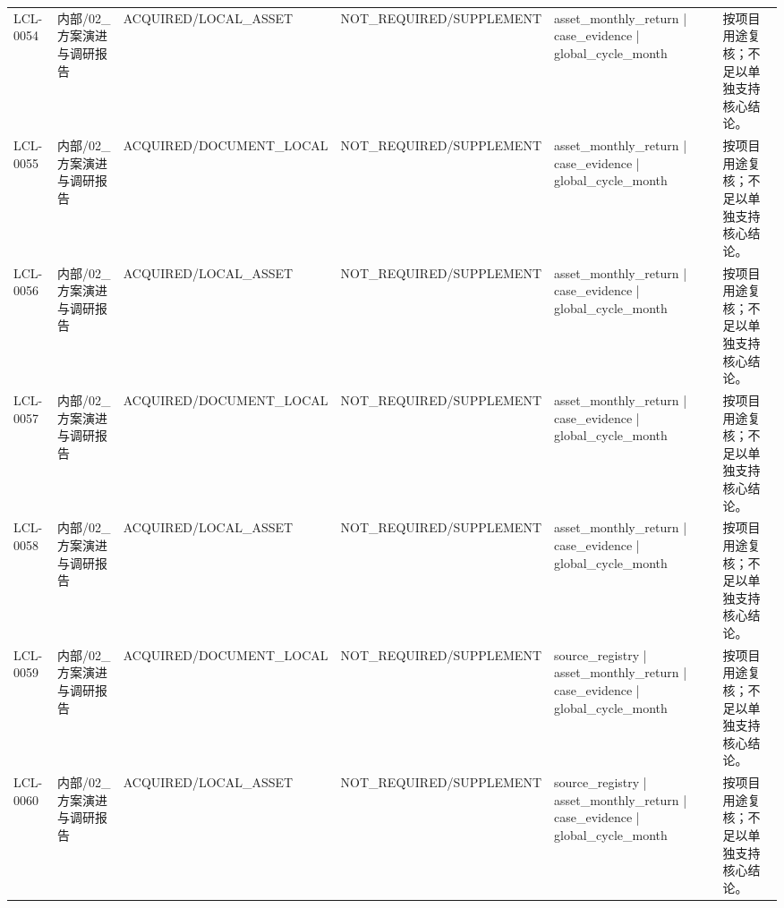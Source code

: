 \begin{landscape}
\begin{longtable}{p{1.8cm}p{2.6cm}p{2.6cm}p{2.6cm}p{4.8cm}p{7.2cm}}
LCL-0054 & 内部/\allowbreak{}02\_\allowbreak{}方案演进与调研报告 & ACQUIRED/\allowbreak{}LOCAL\_\allowbreak{}ASSET & NOT\_\allowbreak{}REQUIRED/\allowbreak{}SUPPLEMENT & asset\_\allowbreak{}monthly\_\allowbreak{}return | case\_\allowbreak{}evidence | global\_\allowbreak{}cycle\_\allowbreak{}month & 按项目用途复核；不足以单独支持核心结论。\\
LCL-0055 & 内部/\allowbreak{}02\_\allowbreak{}方案演进与调研报告 & ACQUIRED/\allowbreak{}DOCUMENT\_\allowbreak{}LOCAL & NOT\_\allowbreak{}REQUIRED/\allowbreak{}SUPPLEMENT & asset\_\allowbreak{}monthly\_\allowbreak{}return | case\_\allowbreak{}evidence | global\_\allowbreak{}cycle\_\allowbreak{}month & 按项目用途复核；不足以单独支持核心结论。\\
LCL-0056 & 内部/\allowbreak{}02\_\allowbreak{}方案演进与调研报告 & ACQUIRED/\allowbreak{}LOCAL\_\allowbreak{}ASSET & NOT\_\allowbreak{}REQUIRED/\allowbreak{}SUPPLEMENT & asset\_\allowbreak{}monthly\_\allowbreak{}return | case\_\allowbreak{}evidence | global\_\allowbreak{}cycle\_\allowbreak{}month & 按项目用途复核；不足以单独支持核心结论。\\
LCL-0057 & 内部/\allowbreak{}02\_\allowbreak{}方案演进与调研报告 & ACQUIRED/\allowbreak{}DOCUMENT\_\allowbreak{}LOCAL & NOT\_\allowbreak{}REQUIRED/\allowbreak{}SUPPLEMENT & asset\_\allowbreak{}monthly\_\allowbreak{}return | case\_\allowbreak{}evidence | global\_\allowbreak{}cycle\_\allowbreak{}month & 按项目用途复核；不足以单独支持核心结论。\\
LCL-0058 & 内部/\allowbreak{}02\_\allowbreak{}方案演进与调研报告 & ACQUIRED/\allowbreak{}LOCAL\_\allowbreak{}ASSET & NOT\_\allowbreak{}REQUIRED/\allowbreak{}SUPPLEMENT & asset\_\allowbreak{}monthly\_\allowbreak{}return | case\_\allowbreak{}evidence | global\_\allowbreak{}cycle\_\allowbreak{}month & 按项目用途复核；不足以单独支持核心结论。\\
LCL-0059 & 内部/\allowbreak{}02\_\allowbreak{}方案演进与调研报告 & ACQUIRED/\allowbreak{}DOCUMENT\_\allowbreak{}LOCAL & NOT\_\allowbreak{}REQUIRED/\allowbreak{}SUPPLEMENT & source\_\allowbreak{}registry | asset\_\allowbreak{}monthly\_\allowbreak{}return | case\_\allowbreak{}evidence | global\_\allowbreak{}cycle\_\allowbreak{}month & 按项目用途复核；不足以单独支持核心结论。\\
LCL-0060 & 内部/\allowbreak{}02\_\allowbreak{}方案演进与调研报告 & ACQUIRED/\allowbreak{}LOCAL\_\allowbreak{}ASSET & NOT\_\allowbreak{}REQUIRED/\allowbreak{}SUPPLEMENT & source\_\allowbreak{}registry | asset\_\allowbreak{}monthly\_\allowbreak{}return | case\_\allowbreak{}evidence | global\_\allowbreak{}cycle\_\allowbreak{}month & 按项目用途复核；不足以单独支持核心结论。\\

\end{longtable}
\end{landscape}
